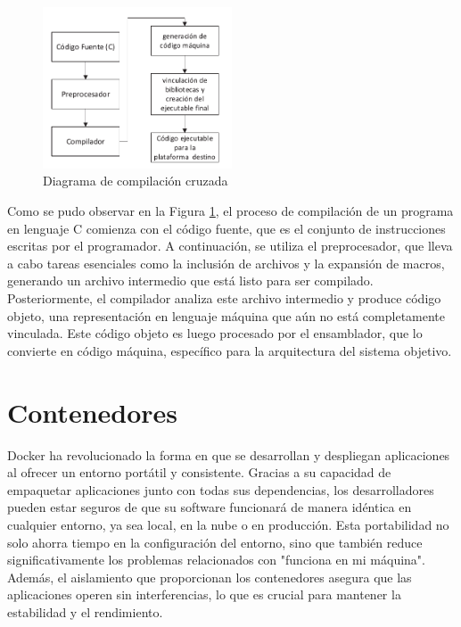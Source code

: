 \begin{figure}[h!]
    \centering
    \includegraphics[width=0.5\textwidth]{fig/teorico/Flujo de trabajo xcompiler.pdf}
    \caption{Diagrama de compilación cruzada}
    \label{fig:xcompile_workflow}
\end{figure}

Como se pudo observar en la Figura \ref{fig:xcompile_workflow}, el proceso de compilación de un programa en lenguaje C comienza con el código fuente, que es el conjunto de instrucciones escritas por el programador. A continuación, se utiliza el preprocesador, que lleva a cabo tareas esenciales como la inclusión de archivos y la expansión de macros, generando un archivo intermedio que está listo para ser compilado. Posteriormente, el compilador analiza este archivo intermedio y produce código objeto, una representación en lenguaje máquina que aún no está completamente vinculada. Este código objeto es luego procesado por el ensamblador, que lo convierte en código máquina, específico para la arquitectura del sistema objetivo.

\section{Contenedores}\label{sec:containers}

Docker ha revolucionado la forma en que se desarrollan y despliegan aplicaciones al ofrecer un entorno portátil y consistente. Gracias a su capacidad de empaquetar aplicaciones junto con todas sus dependencias, los desarrolladores pueden estar seguros de que su software funcionará de manera idéntica en cualquier entorno, ya sea local, en la nube o en producción. Esta portabilidad no solo ahorra tiempo en la configuración del entorno, sino que también reduce significativamente los problemas relacionados con "funciona en mi máquina". Además, el aislamiento que proporcionan los contenedores asegura que las aplicaciones operen sin interferencias, lo que es crucial para mantener la estabilidad y el rendimiento.

